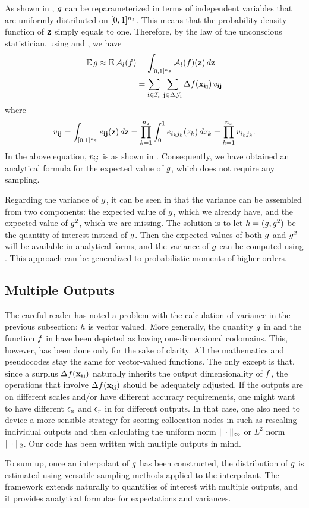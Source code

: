 As shown in , $g$ can be reparameterized in terms of
independent variables that are uniformly distributed on $[0, 1]^{n_z}$. This means
that the probability density function of $\mathbf{z}$ simply equals to one. Therefore,
by the law of the unconscious statistician, using  and
, we have
\begin{align*}
  \mathbb{E} \, g \approx \mathbb{E} \, \mathcal{A}_{l}(f) &= \int_{[0, 1]^{n_z}} \mathcal{A}_{l}(f)(\mathbf{z}) \, d\mathbf{z} \\
  &= \sum_{\mathbf{i} \in \mathcal{I}_l} \, \sum_{\mathbf{j} \in \Delta\mathcal{J}_{\mathbf{i}}} \Delta f(\mathbf{x}_{\mathbf{i}\mathbf{j}}) \, v_{\mathbf{i}\mathbf{j}}
\end{align*}
where
\[
  v_{\mathbf{i}\mathbf{j}} = \int_{[0, 1]^{n_z}} e_{\mathbf{i}\mathbf{j}}(\mathbf{z}) \, d\mathbf{z} = \prod_{k = 1}^{{n_z}} \int_0^1 e_{i_k j_k}(z_k) \, dz_k = \prod_{k = 1}^{{n_z}} v_{i_k j_k}.
\]
In the above equation, $v_{ij}$ is as shown in . Consequently, we
have obtained an analytical formula for the expected value of $g$, which does
not require any sampling.

Regarding the variance of $g$, it can be seen in  that the
variance can be assembled from two components: the expected value of $g$, which
we already have, and the expected value of $g^2$, which we are missing. The
solution is to let $h = (g, g^2)$ be the quantity of interest instead of $g$.
Then the expected values of both $g$ and $g^2$ will be available in analytical
forms, and the variance of $g$ can be computed using . This
approach can be generalized to probabilistic moments of higher orders.

\subsection{Multiple Outputs}
The careful reader has noted a problem with the calculation of variance in the
previous subsection: $h$ is vector valued. More generally, the quantity $g$ in
 and the function $f$ in  have been depicted
as having one-dimensional codomains. This, however, has been done only for the
sake of clarity. All the mathematics and pseudocodes stay the same for
vector-valued functions. The only except is that, since a surplus
$\Delta f(\mathbf{x}_{\mathbf{i}\mathbf{j}})$ naturally inherits the output dimensionality of $f$,
the operations that involve $\Delta f(\mathbf{x}_{\mathbf{i}\mathbf{j}})$ should be adequately
adjusted. If the outputs are on different scales and/or have different accuracy
requirements, one might want to have different $\epsilon_a$ and $\epsilon_r$ in
 for different outputs. In that case, one also need to
device a more sensible strategy for scoring collocation nodes in 
such as rescaling individual outputs and then calculating the uniform norm
$\| \cdot \|_\infty$ or $L^2$ norm $\| \cdot \|_2$. Our code \cite{sources}
has been written with multiple outputs in mind.

To sum up, once an interpolant of $g$ has been constructed, the distribution of
$g$ is estimated using versatile sampling methods applied to the interpolant.
The framework extends naturally to quantities of interest with multiple outputs,
and it provides analytical formulae for expectations and variances.
